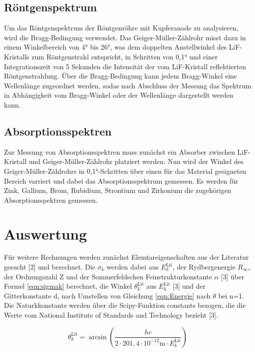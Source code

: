 \documentclass[titlepage = firstcover]{scrartcl}
\begin{document}
        \subsection{Röntgenspektrum}
          Um das Röntgenspektrum der Röntgenröhre mit Kupferanode zu analysieren, wird die Bragg-Bedingung verwendet. Das Geiger-Müller-Zählrohr misst dazu in einem Winkelbereich von 4° bis 26°, was
          dem doppelten Anstellwinkel des LiF-Kristalls zum Röntgenstrahl entspricht, in Schritten von 0,1° und einer Integrationszeit von 5 Sekunden die Intensität der vom LiF-Kristall reflektierten 
          Röntgenstrahlung. Über die Bragg-Bedingung kann jedem Bragg-Winkel eine Wellenlänge zugeordnet werden, sodas nach Abschluss der Messung das Spektrum in Abhängigkeit vom Bragg-Winkel oder der
          Wellenlänge dargestellt werden kann.


        \subsection{Absorptionsspektren}
          Zur Messung von Absorptionsspektren muss zunächst ein Absorber zwischen LiF-Kristall und Geiger-Müller-Zählrohr platziert werden. Nun wird der Winkel des Geiger-Müller-Zählrohrs in 
          0,1°-Schritten über einen für das Material geeigneten Bereich varriert und dabei das Absorptionsspektrum gemessen. Es werden für Zink, Gallium, Brom, Rubidium, Strontium und Zirkonium
          die zugehörigen Absorptionsspektren gemessen.
          

    \newpage
    \section{Auswertung}
        
        Für weitere Rechnungen werden zunächst Elemtareigenschaften aus der Literatur gesucht [2] und berechnet. Die $\sigma_k$ werden dabei aus $E_k^{\text{Lit}}$, der Rydbergenergie $R_{\infty}$, der 
        Ordnungszahl Z und der Sommerfeldschen Feinstrukturkonstante $\alpha$ [3] über Formel \ref{eqn:sigmak} berechnet, die Winkel $\theta_k^{\text{Lit}}$ aus $E_k^{\text{Lit}}$ [3] und der Gitterkonstante d, nach
        Umstellen von Gleichung \ref{eqn:Energie} nach $\theta$ bei n=1. Die Naturkkonstante werden über die Scipy-Funktion constants bezogen, die die Werte vom National Institute of Standards and Technology
        bezieht [3].
        
        \begin{equation*}
          \theta_k^{\text{Lit}} = \arcsin\left(\frac{hc}{2 \cdot 201,4 \cdot 10^{-12} \text{m} \cdot E_k^{\text{Lit}}}\right)
        \end{equation*}
        
\end{document}
